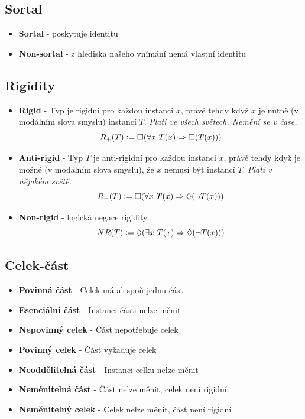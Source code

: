 \documentclass{szzclass}
\begin{document}
\subsection{Sortal}
\begin{itemize}
\item \textbf{Sortal} - poskytuje identitu
\item \textbf{Non-sortal} - z hlediska našeho vnímání nemá vlastní identitu
\end{itemize}

\subsection{Rigidity}
\begin{itemize}
\item \textbf{Rigid} - Typ je rigidní pro každou instanci $x$, právě tehdy když $x$ je nutně (v modálním slova smyslu) instancí $T$. \textit{Platí ve všech světech. Nemění se v čase.} \\
  \[
    R_+(T) \vcentcolon= \square(\forall x~T(x) \Rightarrow \square(T(x)))
  \]
\item \textbf{Anti-rigid} - Typ $T$ je anti-rigidní pro každou instanci $x$, právě tehdy když je možné (v modálním slova smyslu), že $x$ nemusí být instancí $T$. \textit{Platí v nějakém světě.} \\
  \[
    R_-(T) \vcentcolon= \square(\forall x~T(x) \Rightarrow \Diamond(\neg T(x)))
  \]
\item \textbf{Non-rigid} - logická negace rigidity.
  \[
    NR(T) \vcentcolon= \Diamond(\exists x~T(x) \Rightarrow \Diamond(\neg T(x)))
  \]
\end{itemize}

\subsection{Celek-část}
\begin{itemize}
\item \textbf{Povinná část} - Celek má alespoň jednu část
\item \textbf{Esenciální část} - Instanci části nelze měnit
\item \textbf{Nepovinný celek} - Část nepotřebuje celek
\item \textbf{Povinný celek} - Část vyžaduje celek
\item \textbf{Neoddělitelná část} - Instanci celku nelze měnit
\item \textbf{Neměnitelná část} - Část nelze měnit, celek není rigidní
\item \textbf{Neměnitelný celek} - Celek nelze měnit, část není rigidní
\end{itemize}
\end{document}
